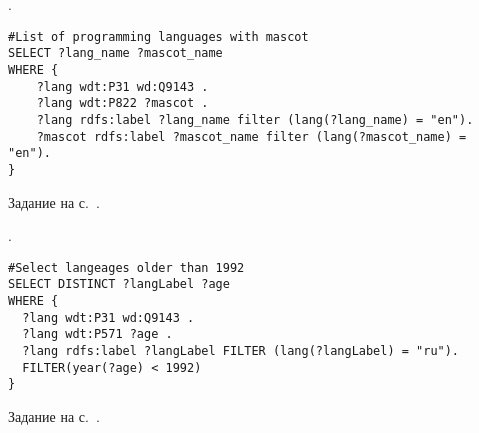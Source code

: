 \begin{task}
    \label{answer:prog_langs_4}
    . 
	\begin{lstlisting}[language=SPARQL, caption={{\href{https://w.wiki/v4e}{<<Персонажи-талисманы>> языков программирования}}\protect\footnotemark}, label=lst:prog_lang_answer_4]
#List of programming languages with mascot
SELECT ?lang_name ?mascot_name
WHERE {
    ?lang wdt:P31 wd:Q9143 .
    ?lang wdt:P822 ?mascot .
    ?lang rdfs:label ?lang_name filter (lang(?lang_name) = "en").
    ?mascot rdfs:label ?mascot_name filter (lang(?mascot_name) = "en").
}
	\end{lstlisting}
    
    \small{Задание на с.~\pageref{prog_lang_test}.}
\end{task}

\begin{task}
    \label{answer:prog_langs_5}
    . 
	\begin{lstlisting}[language=SPARQL, caption={{\href{https://w.wiki/v4f}{Языки программирования, старше 1992 года}}\protect\footnotemark}, label=lst:prog_lang_answer_5]
#Select langeages older than 1992
SELECT DISTINCT ?langLabel ?age
WHERE {
  ?lang wdt:P31 wd:Q9143 .
  ?lang wdt:P571 ?age .
  ?lang rdfs:label ?langLabel FILTER (lang(?langLabel) = "ru").
  FILTER(year(?age) < 1992)
}
	\end{lstlisting}
    
    \small{Задание на с.~\pageref{prog_lang_test}.}
\end{task}

